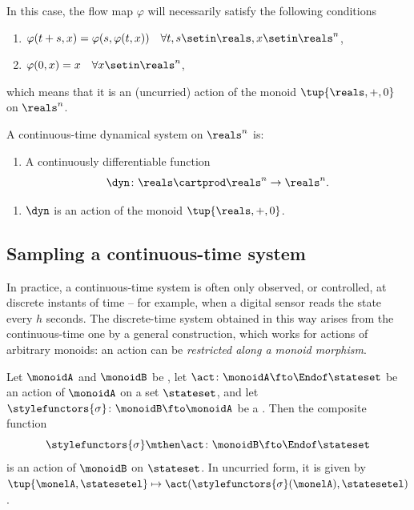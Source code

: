 In this case, the flow map $\varphi$ will necessarily satisfy the following conditions
\begin{enumerate}
    \item $\varphi(t + s, x) = \varphi(s, \varphi(t,x)) \quad \forall t, s \setin \reals, x \setin \reals^n$,
    \item $\varphi(0, x) = x \quad \forall x \setin \reals^n$,
\end{enumerate}
which means that it is an (uncurried) action of the monoid $\tup{\reals, +, 0}$ on $\reals^n$.


\begin{definition}
    \label{def:ct-dynsyst}
    A continuous-time dynamical system on $\reals^n$ is:

    \constit
    \begin{enumerate}
        \item A continuously differentiable function
              \begin{equation}
                  \dyn \colon \reals \cartprod \reals^n \to \reals^n.
              \end{equation}
    \end{enumerate}

    \condit
    \begin{enumerate}
        \item $\dyn$ is an action of the monoid $\tup{\reals, +, 0}$.
    \end{enumerate}
\end{definition}

\subsection{Sampling a continuous-time system}
\label{sec:sampling}

In practice, a continuous-time system is often only observed, or controlled, at discrete instants of time -- for example, when a digital sensor reads the state every $h$ seconds.
The discrete-time system obtained in this way arises from the continuous-time one by a general construction, which works for actions of arbitrary monoids: an action can be \emph{restricted along a monoid morphism}.

\begin{lemma}
    \label{lem:restriction-of-action}
    Let $\monoidA$ and $\monoidB$ be , let $\act \colon \monoidA \fto \Endof\stateset$ be an action of $\monoidA$ on a set $\stateset$, and let $\stylefunctors{\sigma} \colon \monoidB \fto \monoidA$ be a .
    Then the composite function
    \begin{equation}
        \stylefunctors{\sigma} \mthen \act \colon \monoidB \fto \Endof\stateset
    \end{equation}
    is an action of $\monoidB$ on $\stateset$.
    In uncurried form, it is given by $\tup{\monelA, \statesetel} \mapsto \act(\stylefunctors{\sigma}(\monelA), \statesetel)$.
\end{lemma}

